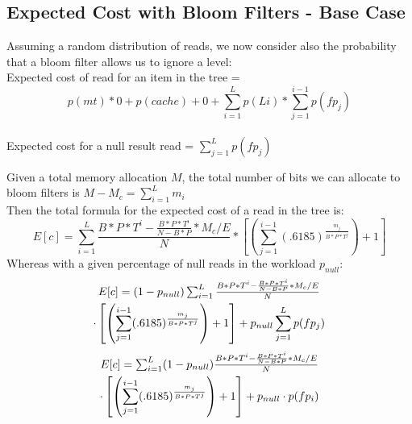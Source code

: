 \documentclass{sig-alternate-05-2015}
\begin{document}
\subsection{Expected Cost with Bloom Filters - Base Case}

Assuming a random distribution of reads, we now consider also the probability that a bloom filter allows us to ignore a level: \\
Expected cost of read for an item in the tree = $$p(mt) * 0  + p(cache) + 0 + \sum_{i=1}^L p(Li) * \sum_{j=1}^{i-1} p(fp_j)$$ \\
Expected cost for a null result read = $\sum_{j=1}^{L} p(fp_j)$

Given a total memory allocation $M$, the total number of bits we can allocate to bloom filters is $M-M_c = \sum_{i=1}^L m_i$ \\
Then the total formula for the expected cost of a read in the tree is: 
$$E[c] = \sum_{i=1}^{L} \frac{B*P*T^i - \frac{B*P*T^i}{N-B*P} * M_c/E}{N} * \left[ \left(\sum_{j=1}^{i-1} (.6185) ^  {\frac{m_j}{B*P*T^j}}\right) +1 \right]$$ 
Whereas with a given percentage of null reads in the workload $p_{null}$:
\begin{multline}
$$E[c] = (1-p_{null})\sum_{i=1}^{L} \frac{B*P*T^i - \frac{B*P*T^i}{N-B*P} * M_c/E}{N} \\ \cdot \left[ \left(\sum_{j=1}^{i-1} (.6185) ^  {\frac{m_j}{B*P*T^j}}\right) +1 \right] + p_{null}\sum_{j=1}^{L} p(fp_j)$$
\end{multline}
\begin{multline}
$$E[c] = \sum_{i=1}^{L} (1-p_{null})\frac{B*P*T^i - \frac{B*P*T^i}{N-B*P} * M_c/E}{N} \\ \cdot \left[ \left(\sum_{j=1}^{i-1} (.6185) ^  {\frac{m_j}{B*P*T^j}}\right) +1 \right] + p_{null} \cdot p(fp_i) $$
\end{multline}
\end{document}
